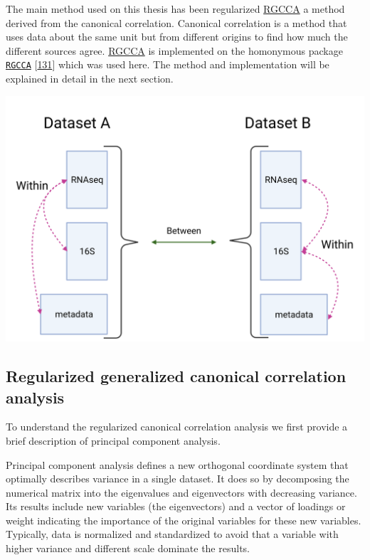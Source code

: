 \documentclass[
  12pt,
  a4paper,
  twoside,
  openright]{book}
\let\origfigure\figure
\let\endorigfigure\endfigure
\renewenvironment{figure}[1][2] {
    \expandafter\origfigure\expandafter[!htbp]
} {
    \endorigfigure
}
\begin{document}
The main method used on this thesis has been regularized \protect\hyperlink{acronyms_RGCCA}{RGCCA} a method derived from the canonical correlation.
Canonical correlation is a method that uses data about the same unit but from different origins to find how much the different sources agree.
\protect\hyperlink{acronyms_RGCCA}{RGCCA} is implemented on the homonymous package \href{https://cran.r-project.org/package=RGCCA}{\texttt{RGCCA}} {[}\protect\hyperlink{ref-tenenhaus2017}{131}{]} which was used here.
The method and implementation will be explained in detail in the next section.

\begin{figure}
\includegraphics[width=1\linewidth]{images/multiomic_datasets} \caption[Multi-omic relationships.]{Multi-omic relationships on different datasets. Integration methods focus on relationships within datasets. Common relationships between datasets are used as confirmation/validation. Created with BioRender.com}\label{fig:multiomic-datasets}
\end{figure}

\hypertarget{regularized-generalized-canonical-correlation-analysis}{%
\subsection{Regularized generalized canonical correlation analysis}\label{regularized-generalized-canonical-correlation-analysis}}

To understand the regularized canonical correlation analysis we first provide a brief description of principal component analysis.

Principal component analysis defines a new orthogonal coordinate system that optimally describes variance in a single dataset.
It does so by decomposing the numerical matrix into the eigenvalues and eigenvectors with decreasing variance.
Its results include new variables (the eigenvectors) and a vector of loadings or weight indicating the importance of the original variables for these new variables.
Typically, data is normalized and standardized to avoid that a variable with higher variance and different scale dominate the results.
\end{document}
